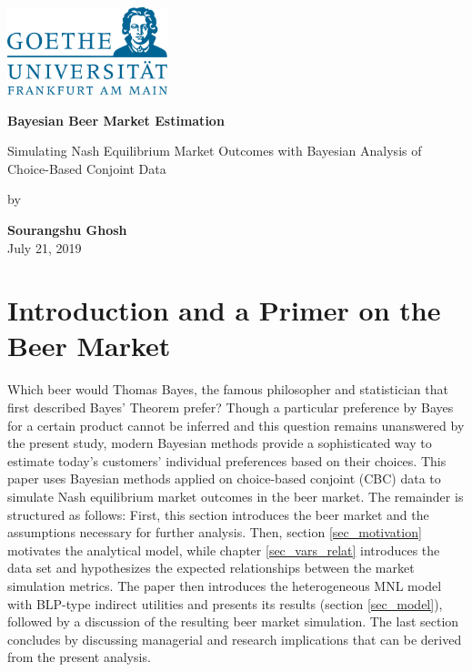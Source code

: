 \documentclass[12pt,a4paper]{article}
\begin{document}
\begin{center}
 \includegraphics[width=0.35\textwidth]{GU-Logo-blau-CMYK.eps} \vspace{2cm}

 {\Large{\bf Bayesian Beer Market Estimation}} \medskip

  {\Large{Simulating Nash Equilibrium Market Outcomes with Bayesian Analysis of Choice-Based Conjoint Data}} \vspace{3cm}  
 
  by \medskip

  \textbf{Sourangshu Ghosh} \\
  
  July 21, 2019
  
\end{center}


\pagebreak
\pagestyle{plain}
\tableofcontents
\pagebreak
\listoffigures
\listoftables
\renewcommand\lstlistlistingname{List of R Code Chunks}
\lstlistoflistings
\newpage
\setcounter{page}{2}
\setlength{\baselineskip}{1.5\baselineskip}
\pagestyle{plain}


\section{Introduction and a Primer on the Beer Market} \label{sec_intro}
Which beer would Thomas Bayes, the famous philosopher and statistician that first described Bayes' Theorem \citep{bayesEssaySolvingProblem1763} prefer?
Though a particular preference by Bayes for a certain product cannot be inferred and this question remains unanswered by the present study, modern Bayesian methods provide a sophisticated way to estimate today's customers' individual preferences based on their choices.
This paper uses Bayesian methods applied on choice-based conjoint (CBC) data to simulate Nash equilibrium market outcomes in the beer market.
The remainder is structured as follows: First, this section introduces the beer market and the assumptions necessary for further analysis.
Then, section \ref{sec_motivation} motivates the analytical model, while chapter \ref{sec_vars_relat} introduces the data set and hypothesizes the expected relationships between the market simulation metrics.
The paper then introduces the heterogeneous MNL model with BLP-type indirect utilities and presents its results (section \ref{sec_model}), followed by a discussion of the resulting beer market simulation.
The last section concludes by discussing managerial and research implications that can be derived from the present analysis.
\end{document}
